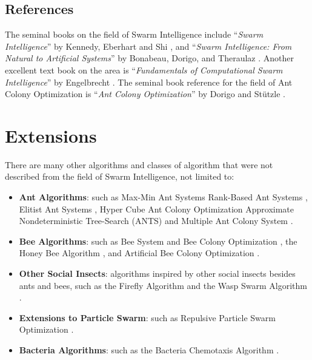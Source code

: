 \begin{bibunit}
\subsection{References}
The seminal books on the field of Swarm Intelligence include ``\emph{Swarm Intelligence}'' by Kennedy, Eberhart and Shi \cite{Kennedy2001}, and ``\emph{Swarm Intelligence: From Natural to Artificial Systems}'' by Bonabeau, Dorigo, and Theraulaz \cite{Bonabeau1999}. Another excellent text book on the area is ``\emph{Fundamentals of Computational Swarm Intelligence}'' by Engelbrecht \cite{Engelbrecht2006}. The seminal book reference for the field of Ant Colony Optimization is ``\emph{Ant Colony Optimization}'' by Dorigo and St\"utzle \cite{Dorigo2004}.

% 
% 
\section{Extensions}
There are many other algorithms and classes of algorithm that were not described from the field of Swarm Intelligence, not limited to:

\begin{itemize}
	\item \textbf{Ant Algorithms}: such as Max-Min Ant Systems \cite{Stutzle2000} Rank-Based Ant Systems \cite{Bullnheimer1999}, Elitist Ant Systems \cite{Dorigo1996}, Hyper Cube Ant Colony Optimization \cite{Blum2001} Approximate Nondeterministic Tree-Search (ANTS) \cite{Maniezzo1999} and Multiple Ant Colony System \cite{Gambardella1999}.
	\item \textbf{Bee Algorithms}: such as Bee System and Bee Colony Optimization \cite{Lucic2001}, the Honey Bee Algorithm \cite{Tovey2004}, and Artificial Bee Colony Optimization \cite{Karaboga2005, Basturk2006}.
	\item \textbf{Other Social Insects}: algorithms inspired by other social insects besides ants and bees, such as the Fireﬂy Algorithm \cite{Yang2008} and the Wasp Swarm Algorithm \cite{Pinto2007}.
	\item \textbf{Extensions to Particle Swarm}: such as Repulsive Particle Swarm Optimization \cite{Urfalioglu2004}.
	\item \textbf{Bacteria Algorithms}: such as the Bacteria Chemotaxis Algorithm \cite{Muller2002}.
\end{itemize}

\putbib
\end{bibunit}


\newpage\begin{bibunit}\putbib\end{bibunit}
\newpage\begin{bibunit}\putbib\end{bibunit}
\newpage\begin{bibunit}\putbib\end{bibunit}
\newpage\begin{bibunit}\putbib\end{bibunit}
\newpage\begin{bibunit}\putbib\end{bibunit}
